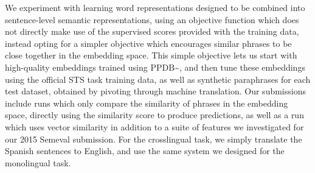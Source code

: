 We experiment with learning word representations designed to be combined into sentence-level semantic representations, using an objective function which does not directly make use of the supervised scores provided with the training data, instead opting for a simpler objective which encourages similar phrases to be close together in the embedding space. This simple objective lets us start with high-quality embeddings trained using PPDB{\textasciitilde}\cite{Wieting16paragram,ppdb:2013}, and then tune these embeddings using the official STS task training data, as well as synthetic paraphrases for each test dataset, obtained by pivoting through machine translation. Our submissions include runs which only compare the similarity of phrases in the embedding space, directly using the similarity score to produce predictions, as well as a run which uses vector similarity in addition to a suite of features we investigated for our 2015 Semeval submission. For the crosslingual task, we simply translate the Spanish sentences to English, and use the same system we designed for the monolingual task.
